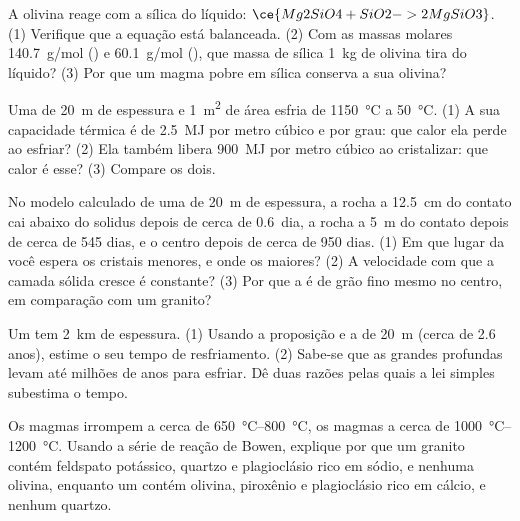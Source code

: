 \begin{exercise}[$\star\star$]\label{exo:g11:igneous-rocks:10}
A olivina reage com a sílica do líquido: $\ce{Mg2SiO4 + SiO2 -> 2
MgSiO3}$. (1) Verifique que a equação está balanceada. (2) Com as massas
molares \qty{140.7}{g/mol} () e \qty{60.1}{g/mol} (),
que massa de sílica \qty{1}{kg} de olivina tira do líquido? (3) Por que um
magma pobre em sílica conserva a sua olivina?
\end{exercise}

\begin{exercise}[$\star\star$]\label{exo:g11:igneous-rocks:11}
Uma  de \qty{20}{m} de espessura e \qty{1}{m^2} de área esfria de
\qty{1150}{\degreeCelsius} a \qty{50}{\degreeCelsius}. (1) A sua capacidade
térmica é de \qty{2.5}{MJ} por metro cúbico e por grau: que calor ela perde
ao esfriar? (2) Ela também libera \qty{900}{MJ} por metro cúbico ao
cristalizar: que calor é esse? (3) Compare os dois.
\end{exercise}

\begin{exercise}[$\star\star\star$]\label{exo:g11:igneous-rocks:12}
No modelo calculado de uma  de \qty{20}{m} de espessura, a rocha a
\qty{12.5}{cm} do contato cai abaixo do solidus depois de cerca de
\num{0.6}~dia, a rocha a \qty{5}{m} do contato depois de cerca de 545 dias,
e o centro depois de cerca de 950 dias. (1) Em que lugar da  você
espera os cristais menores, e onde os maiores? (2) A velocidade com que a
camada sólida cresce é constante? (3) Por que a  é de grão fino
mesmo no centro, em comparação com um granito?
\end{exercise}

\begin{exercise}[$\star\star\star$]\label{exo:g11:igneous-rocks:13}
Um  tem \qty{2}{km} de espessura. (1) Usando a proposição e a 
de \qty{20}{m} (cerca de 2.6 anos), estime o seu tempo de resfriamento.
(2) Sabe-se que as grandes  profundas levam até milhões de anos
para esfriar. Dê duas razões pelas quais a lei simples subestima o tempo.
\end{exercise}

\begin{exercise}[$\star\star\star$]\label{exo:g11:igneous-rocks:14}
Os magmas  irrompem a cerca de \qtyrange{650}{800}{\degreeCelsius},
os magmas  a cerca de \qtyrange{1000}{1200}{\degreeCelsius}. Usando a
série de reação de Bowen, explique por que um granito contém feldspato
potássico, quartzo e plagioclásio rico em sódio, e nenhuma olivina, enquanto
um  contém olivina, piroxênio e plagioclásio rico em cálcio, e nenhum
quartzo.
\end{exercise}

